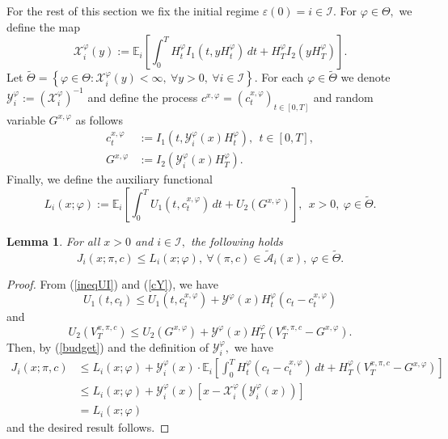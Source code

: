 \documentclass[11pt]{article}
\theoremstyle{plain}
\newtheorem{lemma}[theorem]{Lemma}
\theoremstyle{definition}
\numberwithin{equation}{section}
\newcommand{\calA}{\mathcal{A}}
\newcommand{\Y}{\mathcal{Y}}
\newcommand{\calX}{\mathcal{X}}
\newcommand{\set}[1]{\left\{#1\right\}}
\newcommand{\calI}{\mathcal{I}}
\newcommand{\eps}{\varepsilon}
\newcommand{\Exp}{\mathds{E}}
\begin{document}

For the rest of this section we fix the initial regime $\eps(0)=i\in\calI.$ For $\varphi\in\Theta,$ we define the map
\[
\calX_i^\varphi(y):=\Exp_i\left[\int_0^T H^\varphi_tI_1(t,yH_t^\varphi)\,dt+H^\varphi_TI_2(yH^\varphi_T)\right].
\]
Let $\widetilde{\Theta}=\set{\varphi\in\Theta:\calX_i^\varphi(y)<\infty, \ \forall y>0, \ \forall i\in\calI}.$ For each $\varphi\in\widetilde{\Theta}$ we denote $\Y_i^\varphi:=(\calX_i^\varphi)^{-1}$ and define the process $c^{x,\varphi}=(c_t^{x,\varphi})_{t\in [0,T]}$ and random variable $G^{x,\varphi}$ as follows
\begin{equation}\label{cY}
\begin{split}
  c_t^{x,\varphi} &:=I_1(t,\Y_i^\varphi(x)H_t^\varphi), \ \ t\in [0,T],\\
  G^{x,\varphi}&:=I_2(\Y_i^\varphi(x)H_T^\varphi).
\end{split}
\end{equation}
Finally, we define the auxiliary functional
\[
L_i(x;\varphi):=\Exp_i\left[\int_0^T U_1(t,c_t^{x,\varphi})\,dt+U_2(G^{x,\varphi})\right], \ \ x>0, \ \varphi\in\widetilde{\Theta}.
\]
\begin{lemma}\label{ineqJL}
  For all $x>0$ and $i\in\calI,$ the following holds
     \[
   J_i(x;\pi,c)\leq L_i(x;\varphi), \ \forall (\pi,c)\in\tilde{\calA}_i(x), \ \varphi\in\widetilde{\Theta}.
   \]
\end{lemma}

\begin{proof}
From (\ref{ineqUI}) and (\ref{cY}), we have
\[
U_1(t,c_t)\le U_1(t,c_t^{x,\varphi})+\Y^{\varphi}(x)H_t^{\varphi}(c_t-c_t^{x,\varphi})
\]
and
\[
U_2(V_T^{x,\pi,c})\le U_2(G^{x,\varphi})+\Y^{\varphi}(x)H_T^{\varphi}(V_T^{x,\pi,c}-G^{x,\varphi}).
\]
Then, by (\ref{budget}) and the definition of $\Y_i^{\varphi},$ we have
\begin{align*}
 J_i(x;\pi,c) &\le L_i(x;\varphi)
 +\Y_i^{\varphi}(x)\cdot\Exp_i\left[\int_0^TH_t^{\varphi}(c_t-c_t^{x,\varphi})\,dt+H_T^\varphi(V_T^{x,\pi,c}-G^{x,\varphi})\right]\\
 &\le L_i(x;\varphi)+\Y_i^{\varphi}(x)[x-\calX_i^{\varphi}(\Y_i^{\varphi}(x))]\\
 &= L_i(x;\varphi)
\end{align*}
and the desired result follows.
\end{proof}
\end{document}

